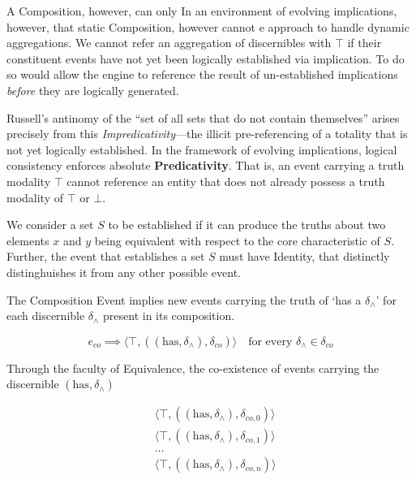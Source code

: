 \documentclass[11pt, a4paper]{article}
\theoremstyle{formalism}
\begin{document}
A Composition, however, can only 
In an environment of evolving implications, however, that static Composition, 
however cannot e
approach to handle dynamic aggregations. We cannot refer an
aggregation of discernibles with $\top$ if their constituent events have not yet
been logically established via implication. To do so would allow the engine to
reference the result of un-established implications \textit{before} they are
logically generated. 

Russell's antinomy of the ``set of all sets that do not contain themselves''
arises precisely from this \textit{Impredicativity}---the illicit
pre-referencing of a totality that is not yet logically established. In the
framework of evolving implications, logical consistency enforces absolute
\textbf{Predicativity}. That is, an event carrying a truth modality $\top$
cannot reference an entity that does not already possess a truth modality of
$\top$ or $\bot$. 

We consider a set $S$ to be established if it can produce the truths about two
elements $x$ and $y$ being equivalent with respect to the core characteristic
of $S$. Further, the event that establishes a set $S$ must have Identity, that
distinctly distinghuishes it from any other possible event.

The Composition Event implies new events carrying the truth of `has a
$\delta_\wedge$' for each discernible $\delta_\wedge$ present in its
composition. 

\begin{equation}
    e_{co} \implies \langle \top, ((\text{has}, \delta_\wedge), \delta_{co}) \rangle \quad \text{for every } \delta_\wedge \in \delta_{co}
\end{equation}

Through the faculty of Equivalence, the co-existence of events
carrying the discernible $(\text{has}, \delta_\wedge)$

\begin{equation}
    \begin{aligned}
        & \langle \top, ((\text{has}, \delta_\wedge), \delta_{co,0}) \rangle \\
        & \langle \top, ((\text{has}, \delta_\wedge), \delta_{co,1}) \rangle \\
        & \ldots \\
        & \langle \top, ((\text{has}, \delta_\wedge), \delta_{co,n}) \rangle
    \end{aligned}
\end{equation}
\end{document}
